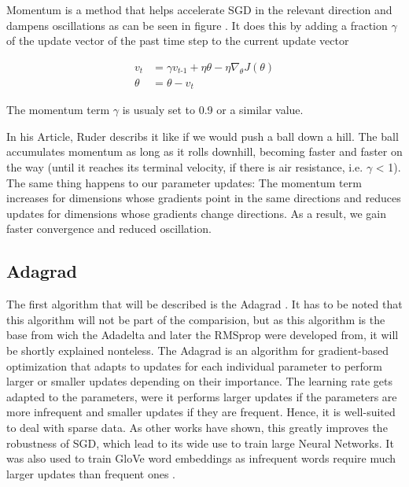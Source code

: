 \documentclass[12pt,oneside,a4paper,parskip]{scrbook}
\begin{document}
Momentum \cite{QIAN1999145, overvieDiffRSLVQ} is a method that helps accelerate SGD in the relevant direction and dampens
oscillations as can be seen in figure . It does this by adding a fraction $\gamma $ of the update vector of the past time step to the
current update vector

\begin{equation}
\begin{split}
\textit{v}_\textit{t} &= \gamma\textit{v}_\textit{t-1} + \eta \theta - \eta\nabla_\theta \textit{J}(\theta) \\
\theta &= \theta - \textit{v}_\textit{t}
\end{split}
\end{equation}

The momentum term $\gamma $ is usualy set to 0.9 or a similar value.

In his Article, Ruder \cite{overvieDiffRSLVQ} describs it like if we would push a ball down a hill. 
The ball accumulates momentum as long as it rolls downhill, becoming faster and faster on the way 
(until it reaches its terminal velocity, if there is air resistance, i.e. $\gamma $ < 1). 
The same thing happens to our parameter updates: The momentum term increases for dimensions whose gradients
point in the same directions and reduces updates for dimensions whose gradients change directions.
As a result, we gain faster convergence and reduced oscillation.

\subsection{Adagrad}
The first algorithm that will be described is the Adagrad \cite{Zeiler2012ADADELTAAA}. It has to be noted that this 
algorithm will not be part of the comparision, but as this algorithm is the base from wich the Adadelta and later the 
RMSprop were developed from, it will be shortly explained nonteless.
The Adagrad is an algorithm for gradient-based optimization that adapts to updates for each individual parameter to 
perform larger or smaller updates depending on their importance. The learning rate gets adapted to the parameters, were
it performs larger updates if the parameters are more infrequent and smaller updates if they are frequent.
Hence, it is well-suited to deal with sparse data. As other works \cite{dean2012large} have shown, this greatly improves
the robustness of SGD, which lead to its wide use to train large Neural Networks.
It was also used to train GloVe word embeddings as infrequent words require
much larger updates than frequent ones \cite{pennington2014glove, overvieDiffRSLVQ}.   
\end{document}
